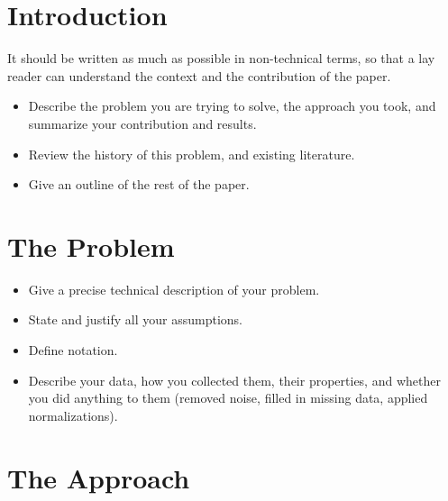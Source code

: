 \documentclass[10pt]{article}
\begin{document}
\section{Introduction}
It should be written as much as possible in non-technical terms, so that a
lay reader can understand the context and the contribution of the paper.

\begin{itemize}
\item Describe the problem you are trying to solve, the approach
you took, and summarize your contribution and results.

\item Review the history of this problem, and existing literature.

\item Give an outline of the rest of the paper.
\end{itemize}

\section{The Problem}
\begin{itemize}
\item Give a precise technical description of your problem. 

\item State and justify all your assumptions. 

\item Define notation. 

\item Describe your data, how you collected them, their properties,
and whether you did 
anything to them (removed noise, filled in missing data, 
applied normalizations).
\end{itemize}

\section{The Approach}
\end{document}
